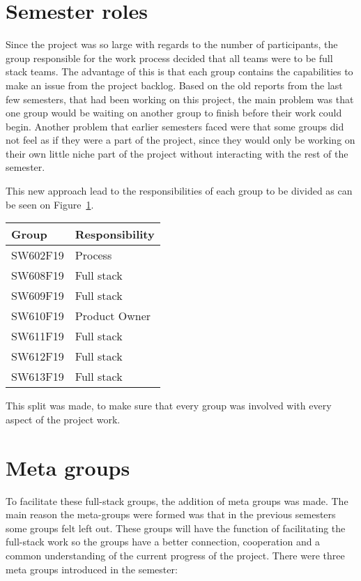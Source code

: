 \section{Semester roles}
Since the project was so large with regards to the number of participants, the group responsible for the work process decided that all teams were to be full stack teams.
The advantage of this is that each group contains the capabilities to make an issue from the project backlog.
Based on the old reports from the last few semesters, that had been working on this project, the main problem was that one group would be waiting on another group to finish before their work could begin.
Another problem that earlier semesters faced were that some groups did not feel as if they were a part of the project, since they would only be working on their own little niche part of the project without interacting with the rest of the semester.

This new approach lead to the responsibilities of each group to be divided as can be seen on Figure~\ref{TBL:GroupResponsibility}.
\begin{table}[H]
\centering
\begin{tabular}{|l|l|}
\hline
\textbf{Group} & \textbf{Responsibility} \\ \hline
SW602F19 & Process\\ \hline
SW608F19 & Full stack\\ \hline
SW609F19 & Full stack\\ \hline
SW610F19 & Product Owner  \\ \hline
SW611F19 & Full stack \\ \hline
SW612F19 & Full stack \\ \hline
SW613F19 & Full stack \\ \hline
\end{tabular}
\label{TBL:GroupResponsibility}
\end{table}

This split was made, to make sure that every group was involved with every aspect of the project work.
\section{Meta groups}
To facilitate these full-stack groups, the addition of meta groups was made.
The main reason the meta-groups were formed was that in the previous semesters some groups felt left out.
These groups will have the function of facilitating the full-stack work so the groups have a better connection, cooperation and a common understanding of the current progress of the project.
There were three meta groups introduced in the semester:

